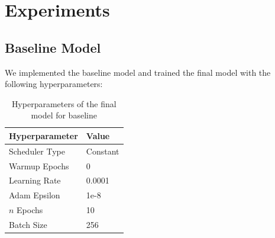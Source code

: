 \documentclass{article}
\begin{document}
    \section{Experiments}

    \subsection{Baseline Model}



    We implemented the baseline model and trained the final model with the following hyperparameters:

    \begin{table}[H]
        \centering
        \begin{tabular}{ll}
            \toprule
            \textbf{Hyperparameter} & \textbf{Value} \\
            \midrule
            Scheduler Type          & Constant       \\
            Warmup Epochs           & 0              \\
            Learning Rate           & 0.0001         \\
            Adam Epsilon            & 1e-8           \\
            $n$ Epochs              & 10             \\
            Batch Size              & 256            \\
            \bottomrule
        \end{tabular}
        \caption{Hyperparameters of the final model for baseline}
        \label{tab:hyps_baseline}
    \end{table}
\end{document}
